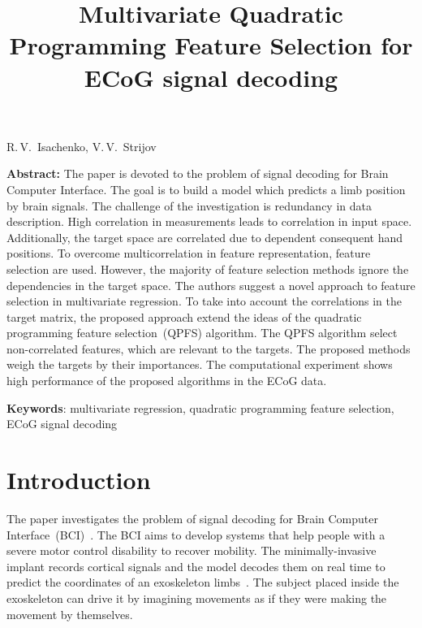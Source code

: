 \documentclass[12pt,twoside]{article}
\theoremstyle{definition}
\begin{document}
	
	\linenumbers
	
	\title
{Multivariate Quadratic Programming Feature Selection for ECoG signal decoding}
\date{}
\maketitle
\begin{center}
	R.\,V.~Isachenko,
	V.\,V.~Strijov
\end{center}
\textbf{Abstract:} 
The paper is devoted to the problem of signal decoding for Brain Computer Interface. 
The goal is to build a model which predicts a limb position by brain signals. 
The challenge of the investigation is redundancy in data description. 
High correlation in measurements leads to correlation in input space. Additionally, the target space are correlated due to dependent consequent hand positions.
To overcome multicorrelation in feature representation, feature selection are used.
However, the majority of feature selection methods ignore the dependencies in the target space.
The authors suggest a novel approach to feature selection in multivariate regression.
To take into account the correlations in the target matrix, the proposed approach extend the ideas of the quadratic programming feature selection~(QPFS) algorithm. 
The QPFS algorithm select non-correlated features, which are relevant to the targets. The proposed methods weigh the targets by their importances.
The computational experiment shows high performance of the proposed algorithms in the ECoG data.

\bigskip
\textbf{Keywords}: multivariate regression, quadratic programming feature selection, ECoG signal decoding

\section{Introduction}
The paper investigates the problem of signal decoding for Brain Computer Interface~(BCI)~\cite{costecalde2018long}. 
The BCI aims to develop systems that help people with a severe motor control disability to recover mobility.
The minimally-invasive implant records cortical signals and the model decodes them on real time to predict the coordinates of an exoskeleton limbs~\cite{mestais2015wimagine,eliseyev2014clinatec}.
The subject placed inside the exoskeleton can drive it by imagining movements as if they were making the movement by themselves. 
\end{document}
